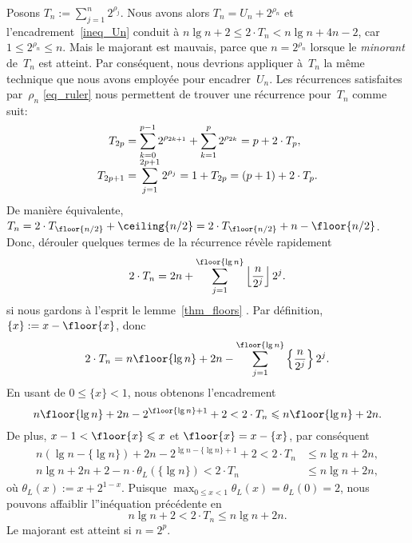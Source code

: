 Posons \(T_n := \sum_{j=1}^{n}{2^{\rho_{j}}}\). Nous avons alors \(T_n
= U_n + 2^{\rho_n}\) et l'encadrement~\eqref{ineq_Un} conduit à \(n\lg
n + 2 \leqslant 2 \cdot T_n < n\lg n + 4n - 2\), car \(1 \leqslant
2^{\rho_n} \leqslant n\). Mais le majorant est mauvais, parce que \(n
= 2^{\rho_n}\) lorsque le \emph{minorant} de~\(T_n\) est atteint. Par
conséquent, nous devrions appliquer à~\(T_n\) la même technique que
nous avons employée pour encadrer~\(U_n\). Les récurrences satisfaites
par~\(\rho_n\) \eqref{eq_ruler} nous permettent de trouver une
récurrence pour~\(T_n\) comme suit:
\begin{align*}
T_{2p} &= \sum_{k=0}^{\smash[t]{p-1}}{2^{\rho_{2k+1}}} +
\sum_{k=1}^{p}{2^{\rho_{2k}}} = p + 2 \cdot T_{p},\\
 T_{2p+1}
&= \sum_{j=1}^{\smash[t]{2p+1}}{2^{\rho_{j}}} = 1 + T_{2p} = (p + 1) +
2 \cdot T_{p}.
\end{align*}
De manière équivalente, \(T_{n} = 2 \cdot T_{\floor{n/2}} +
\ceiling{n/2} = 2 \cdot T_{\floor{n/2}} + n - \floor{n/2}\). Donc,
dérouler quelques termes de la récurrence révèle rapidement
\begin{equation*}
2 \cdot T_n = 2n + \sum_{j=1}^{\floor{\lg n}}
            {\left\lfloor{\frac{n}{2^j}}\right\rfloor 2^j}.
\end{equation*}
si nous gardons à l'esprit le lemme~\ref{thm_floors}
. Par définition, \(\{x\} := x - \floor{x}\),
donc
\begin{equation*}
2 \cdot T_n = n\floor{\lg n} + 2n - \sum_{j=1}^{\floor{\lg
    n}}\left\lbrace\frac{n}{2^j}\right\rbrace 2^j.
\end{equation*}
En usant de \(0 \leqslant \{x\} < 1\), nous obtenons l'encadrement
\begin{equation*}
n\floor{\lg n} + 2n - 2^{\floor{\lg n}+1} + 2 < 2 \cdot T_n \leqslant
n\floor{\lg n} + 2n.
\end{equation*}
De plus, \(x - 1 < \floor{x} \leqslant x\) et \(\floor{x} = x -
\{x\}\), par conséquent
\begin{align*}
n(\lg n - \{\lg n\}) + 2n - 2^{\lg n - \{\lg n\} +
  1} + 2 < 2 \cdot T_n &\leqslant n\lg n + 2n,\\
n\lg n + 2n + 2 - n \cdot \theta_L(\{\lg n\}) < 2 \cdot T_n 
&\leqslant n\lg n + 2n,
\end{align*}
où \(\theta_L(x) := x + 2^{1 - x}\). Puisque \(\max_{0 \leqslant x <
  1}\theta_L(x) = \theta_L(0) = 2\), nous pouvons affaiblir
l''inéquation précédente en
\begin{equation}
n\lg n + 2 < 2 \cdot T_n \leqslant n\lg n + 2n.
\label{ineq_Tn}
\end{equation}
Le majorant est atteint si \(n=2^p\).

